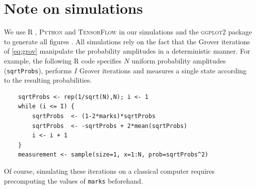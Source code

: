 \documentclass[12pt]{article} %
\begin{document}
\section{Note on simulations}

We use \textsc{R} \citep{rlang}, \textsc{Python} \citep{vanrossum1995python} and \textsc{TensorFlow} \citep{abadi2016tensorflow}  in our simulations and the \textsc{ggplot2} package to generate all figures \citep{ggplot}.  All simulations rely on the fact that the Grover iterations of \eqref{eq:grov} manipulate the probability amplitudes in a deterministic manner. For example, the following \textsc{R} code specifies $N$ uniform probability amplitudes (\verb|sqrtProbs|), performs $I$ Grover iterations and measures a single state according to the resulting probabilities.
\begin{verbatim}
	sqrtProbs <- rep(1/sqrt(N),N); i <- 1
	while (i <= I) {
		sqrtProbs  <- (1-2*marks)*sqrtProbs
		sqrtProbs  <- -sqrtProbs + 2*mean(sqrtProbs)
		i <- i + 1
	}
	measurement <- sample(size=1, x=1:N, prob=sqrtProbs^2)
\end{verbatim}
Of course, simulating these iterations on a classical computer requires precomputing the values of \verb|marks| beforehand.






\end{document}
